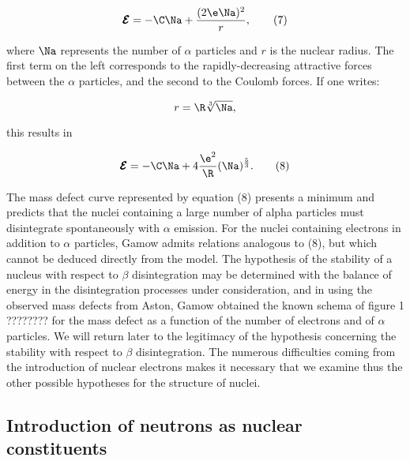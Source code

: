 \documentclass{article}
\newcommand{\const}[1]{#1}
\newcommand{\Etotal}{\pmb{\mathcal{E}}}
\newcommand{\nequ}[2]{
\begin{equation*}
#1
\tag{#2}
\end{equation*}
}
\newcommand{\uequ}[1]{
\begin{equation*}
#1
\end{equation*}
}
\begin{document}
\nequ{
\Etotal = -\C\Na + \frac{(2\e\Na)^2}{\const{r}},
}{7}

where $\Na$ represents the number of $\alpha$ particles and $\const{r}$ is the nuclear radius. The first term on the left corresponds to the rapidly-decreasing attractive forces between the $\alpha$ particles, and the second to the Coulomb forces. If one writes:

\uequ{
\const{r} = \R\sqrt[3]{\Na},
}

this results in

\nequ{
\Etotal = -\C\Na + 4\frac{\e^2}{\R}(\Na)^{\frac{5}{3}}.
}{8}

The mass defect curve represented by equation (8) presents a minimum and predicts that the nuclei containing a large number of alpha particles must disintegrate spontaneously with $\alpha$ emission. For the nuclei containing electrons in addition to $\alpha$ particles, Gamow admits relations analogous to (8), but which cannot be deduced directly from the model. The hypothesis of the stability of a nucleus with respect to $\beta$ disintegration may be determined with the balance of energy in the disintegration processes under consideration, and in using the observed mass defects from Aston, Gamow obtained the known schema of figure 1 ???????? for the mass defect as a function of the number of electrons and of $\alpha$ particles. We will return later to the legitimacy of the hypothesis concerning the stability with respect to $\beta$ disintegration.
The numerous difficulties coming from the introduction of nuclear electrons makes it necessary that we examine thus the other possible hypotheses for the structure of nuclei.

\subsection{Introduction of neutrons as nuclear constituents}
\end{document}
